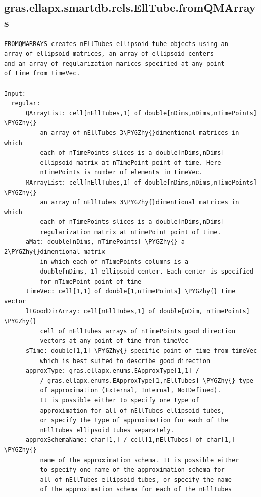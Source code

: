 \documentclass[letterpaper,10pt,english]{sphinxmanual}
\def\PYGZhy{\char`\-}
\begin{document}
\subsection{gras.ellapx.smartdb.rels.EllTube.fromQMArrays}
\label{chap_functions:gras-ellapx-smartdb-rels-elltube-fromqmarrays}
\begin{Verbatim}[commandchars=\\\{\}]
FROMQMARRAYS creates nEllTubes ellipsoid tube objects using an
array of ellipsoid matrices, an array of ellipsoid centers
and an array of regularization marices specified at any point
of time from timeVec.

Input:
  regular:
      QArrayList: cell[nEllTubes,1] of double[nDims,nDims,nTimePoints] \PYGZhy{}
          an array of nEllTubes 3\PYGZhy{}dimentional matrices in which
          each of nTimePoints slices is a double[nDims,nDims]
          ellipsoid matrix at nTimePoint point of time. Here
          nTimePoints is number of elements in timeVec.
      MArrayList: cell[nEllTubes,1] of double[nDims,nDims,nTimePoints] \PYGZhy{}
          an array of nEllTubes 3\PYGZhy{}dimentional matrices in which
          each of nTimePoints slices is a double[nDims,nDims]
          regularization matrix at nTimePoint point of time.
      aMat: double[nDims, nTimePoints] \PYGZhy{} a 2\PYGZhy{}dimentional matrix
          in which each of nTimePoints columns is a
          double[nDims, 1] ellipsoid center. Each center is specified
          for nTimePoint point of time
      timeVec: cell[1,1] of double[1,nTimePoints] \PYGZhy{} time vector
      ltGoodDirArray: cell[nEllTubes,1] of double[nDim, nTimePoints] \PYGZhy{}
          cell of nEllTubes arrays of nTimePoints good direction
          vectors at any point of time from timeVec
      sTime: double[1,1] \PYGZhy{} specific point of time from timeVec
          which is best suited to describe good direction
      approxType: gras.ellapx.enums.EApproxType[1,1] /
          / gras.ellapx.enums.EApproxType[1,nEllTubes] \PYGZhy{} type
          of approximation (External, Internal, NotDefined).
          It is possible either to specify one type of
          approximation for all of nEllTubes ellipsoid tubes,
          or specify the type of approximation for each of the
          nEllTubes ellipsoid tubes separately.
      approxSchemaName: char[1,] / cell[1,nEllTubes] of char[1,] \PYGZhy{}
          name of the approximation schema. It is possible either
          to specify one name of the approximation schema for
          all of nEllTubes ellipsoid tubes, or specify the name
          of the approximation schema for each of the nEllTubes

\end{Verbatim}
\end{document}
